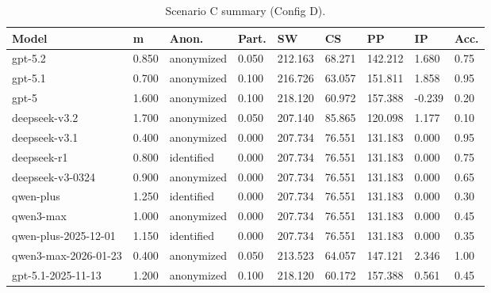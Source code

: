 \begin{table}[t]
  \centering
  \caption{Scenario C summary (Config D).}
  \label{tab:app_sc_c_D}
  \small
  \setlength{\tabcolsep}{4pt}
  \renewcommand{\arraystretch}{1.05}
  \begin{tabular}{p{3.2cm} p{1.6cm} p{1.4cm} p{1.2cm} p{1.25cm} p{1.25cm} p{1.25cm} p{1.25cm} p{1.05cm}}
    \toprule
    Model & m & Anon. & Part. & SW & CS & PP & IP & Acc. \\
    \midrule
    gpt-5.2 & 0.850 & anonymized & 0.050 & 212.163 & 68.271 & 142.212 & 1.680 & 0.75 \\
    gpt-5.1 & 0.700 & anonymized & 0.100 & 216.726 & 63.057 & 151.811 & 1.858 & 0.95 \\
    gpt-5 & 1.600 & anonymized & 0.100 & 218.120 & 60.972 & 157.388 & -0.239 & 0.20 \\
    deepseek-v3.2 & 1.700 & anonymized & 0.050 & 207.140 & 85.865 & 120.098 & 1.177 & 0.10 \\
    deepseek-v3.1 & 0.400 & anonymized & 0.000 & 207.734 & 76.551 & 131.183 & 0.000 & 0.95 \\
    deepseek-r1 & 0.800 & identified & 0.000 & 207.734 & 76.551 & 131.183 & 0.000 & 0.75 \\
    deepseek-v3-0324 & 0.900 & anonymized & 0.000 & 207.734 & 76.551 & 131.183 & 0.000 & 0.65 \\
    qwen-plus & 1.250 & identified & 0.000 & 207.734 & 76.551 & 131.183 & 0.000 & 0.30 \\
    qwen3-max & 1.000 & anonymized & 0.000 & 207.734 & 76.551 & 131.183 & 0.000 & 0.45 \\
    qwen-plus-2025-12-01 & 1.150 & identified & 0.000 & 207.734 & 76.551 & 131.183 & 0.000 & 0.35 \\
    qwen3-max-2026-01-23 & 0.400 & anonymized & 0.050 & 213.523 & 64.057 & 147.121 & 2.346 & 1.00 \\
    gpt-5.1-2025-11-13 & 1.200 & anonymized & 0.100 & 218.120 & 60.172 & 157.388 & 0.561 & 0.45 \\
    \bottomrule
  \end{tabular}
\end{table}


